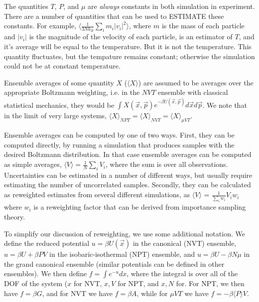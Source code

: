 \documentclass[a4paper,12pt]{article}
\begin{document}
The quantities $T$, $P$, and $\mu$ are {\em always} constants in both
simulation in experiment.  There are a number of quantities that can
be used to ESTIMATE these constants. For example, $\langle
\frac{1}{3Nk_B}\sum_i m_i |v_i|^2\rangle$, where $m$ is the mass of each
particle and $|v_i|$ is the magnitude of the velocity of each
particle, is an estimator of $T$, and it's average will be equal to
the temperature. But it is not the temperature. This quantity
fluctuates, but the tempature remains constant; otherwise the
simulation could not be at constant temperature.

Ensemble averages of some quantity $X$ ($\langle X \rangle$) are
assumed to be averages over the appropriate Boltzmann weighting,
i.e. in the $NVT$ ensemble with classical statistical mechanics, they
would be $\int X(\vec{x},\vec{p}) e^{-\beta U(\vec{x},\vec{p})} d\vec{x}d\vec{p}$. We
note that in the limit of very large systems, $\langle X \rangle_{NPT}
= \langle X \rangle_{NVT} = \langle X \rangle_{\mu VT}$.

Ensemble averages can be computed by one of two ways. First, they can
be computed directly, by running a simulation that produces samples
with the desired Boltzmann distribution.  In that case ensemble
averages can be computed as simple averages, $\langle V \rangle =
\frac{1}{N}\sum_i V_i$, where the sum is over all observations.
Uncertainties can be estimated in a number of different ways, but
usually require estimating the number of uncorrelated
samples. Secondly, they can be calculated as reweighted estimates from
several different simulations, as $\langle V \rangle$ =
$\frac{1}{\sum_i w_i} V_i w_i$ where $w_i$ is a reweighting factor
that can be derived from importance sampling theory. 

To simplify our discussion of reweighting, we use some additional
notation.  We define the reduced potential $u = \beta U(\vec{x})$ in
the canonical (NVT) ensemble, $u = \beta U + \beta PV$ in the
isobaric-isothermal (NPT) ensemble, and $u = \beta U - \beta N\mu$ in
the grand canonical ensemble (similar potentials can be defined in
other ensembles). We then define $f = \int e^{-u} dx$, where the
integral is over all of the DOF of the system ($x$ for NVT, $x,V$ for
NPT, and $x,N$ for.  For NPT, we then have $f = \beta G$, and for NVT
we have $f = \beta A$, while for $\mu V T$ we have $f = -\beta \langle
P \rangle V$.
\end{document}
